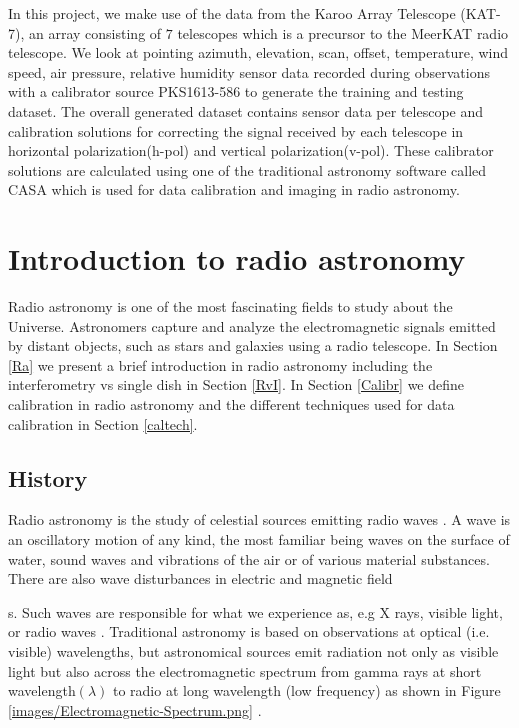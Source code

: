 In this project, we make use of the data from the Karoo Array Telescope (KAT-7), an array consisting of $7$ telescopes which is a precursor to the MeerKAT radio telescope. We look at pointing azimuth, elevation, scan, offset, temperature, wind speed, air pressure, relative humidity sensor data recorded during  observations with a calibrator source PKS1613-586 to generate the training and testing dataset. The overall generated dataset contains sensor data per telescope and calibration solutions for correcting the signal received by each telescope in horizontal polarization(h-pol)  and vertical polarization(v-pol). These calibrator solutions are calculated using one of the traditional astronomy software called CASA which is used for data calibration and imaging in radio astronomy.
 
\section{Introduction to radio astronomy}

Radio astronomy is one of the most fascinating fields to study about the Universe. Astronomers capture and analyze the electromagnetic signals emitted by distant objects, such as stars and galaxies using a radio telescope. In Section \ref{Ra} we present a brief introduction in radio astronomy including the interferometry vs single dish in Section \ref{RvI}. In Section \ref{Calibr} we define calibration in radio astronomy and the different techniques used for data calibration in Section \ref{caltech}.
\label{Ra}
\subsection{History}


Radio astronomy is the study of celestial sources emitting radio waves \citep{verschuur2015invisible}. A wave is an oscillatory motion of any kind, the most familiar being waves on the surface of water, sound waves and vibrations of the air or of various material substances. There are also wave disturbances in electric and magnetic field\newtheorem{mydef}{Definition}s. Such waves are responsible for what we experience as, e.g X rays, visible light, or radio waves \citep{cassidy2002wave}. Traditional astronomy is based on observations at optical (i.e. visible) wavelengths, but astronomical sources emit radiation not only as visible light but
also across the electromagnetic spectrum from gamma rays at short wavelength$(\lambda)$ to radio at long wavelength (low frequency) as shown in Figure \ref{images/Electromagnetic-Spectrum.png} \citep{staats2016genetic}.

